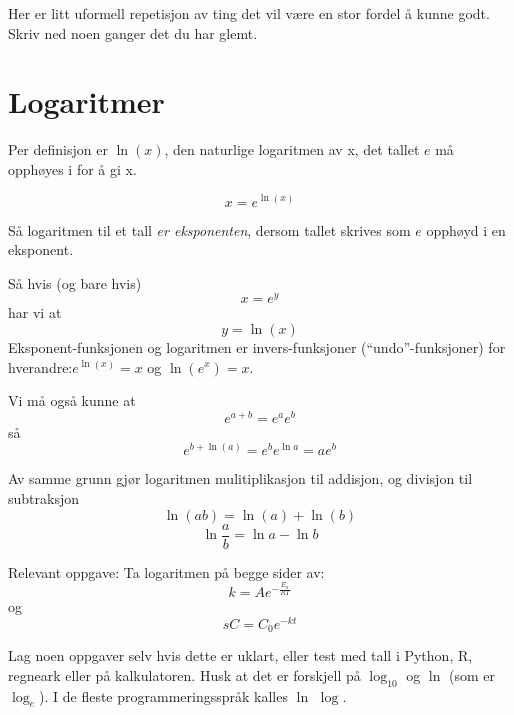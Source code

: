 \documentclass[11pt, A4paper]{article}
\begin{document}
Her er litt uformell repetisjon av ting det vil være en stor fordel å kunne godt. Skriv ned noen ganger det du har glemt.

\section{Logaritmer}

Per definisjon er $\ln(x)$, den naturlige logaritmen av x,  det tallet $e$ må opphøyes i for å gi x.

\begin{equation*}
\label{eq:6}
x = e^{\ln(x)}
\end{equation*}

Så logaritmen til et tall \textit{er eksponenten}, dersom tallet skrives som $e$ opphøyd i en eksponent.

Så hvis (og bare hvis)
\begin{equation*}
\label{eq:8}
x = e^y
\end{equation*}
har vi at
\begin{equation*}
\label{eq:9}
y = \ln(x)
\end{equation*}
Eksponent-funksjonen og logaritmen er invers-funksjoner (``undo''-funksjoner) for hverandre:\newline $e^{\ln(x)}=x$ og $\ln(e^x)=x$. 

Vi må også kunne at
\begin{equation*}
\label{eq:10}
e^{a+b} = e^ae^b
\end{equation*}
så
\begin{equation*}
\label{eq:12}
e^{b+\ln(a)} = e^b e^{\ln{a}} = ae^{b}
\end{equation*}

Av samme grunn gjør logaritmen mulitiplikasjon til addisjon, og divisjon til subtraksjon
\begin{equation*}
\label{eq:7}
\ln(a b) = \ln(a) + \ln(b)
\end{equation*}
\begin{equation*}
\label{eq:13}
\ln{\frac{a}{b}} = \ln{a}-\ln{b}
\end{equation*}

Relevant oppgave: Ta logaritmen på begge sider av:
\begin{equation*}
\label{eq:14}
k = A e^{-\frac{E_a}{RT}}
\end{equation*}
og
\begin{equation*}s
\label{eq:15}
C = C_0 e^{-kt}
\end{equation*}

Lag noen oppgaver selv hvis dette er uklart, eller test med tall i Python, R, regneark
eller på kalkulatoren.  Husk at det er forskjell på $\log_{10}$ og
$\ln$ (som er $\log_e$). I de fleste programmeringsspråk kalles $\ln$ $\log$.
\end{document}
